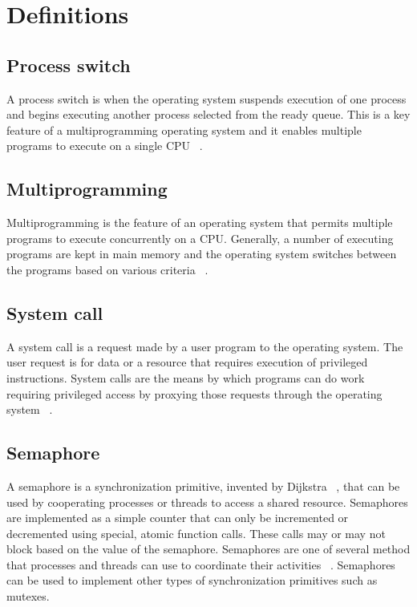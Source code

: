 \documentclass[12pt]{article}
\date{\today}
\begin{document}
\maketitle

\section*{Definitions}
\subsection*{Process switch}
A process switch is when the operating system suspends execution of
one process and begins executing another process selected from the
ready queue.  This is a key feature of a multiprogramming operating
system and it enables multiple programs to execute on a single CPU
~\cite{stallings}.

\subsection*{Multiprogramming}
Multiprogramming is the feature of an operating system that permits
multiple programs to execute concurrently on a CPU. Generally, a
number of executing programs are kept in main memory and the
operating system switches between the programs based on various
criteria ~\cite{stallings}.

\subsection*{System call}
A system call is a request made by a user program to the operating
system.  The user request is for data or a resource that requires
execution of privileged instructions.  System calls are the means by
which programs can do work requiring privileged access by proxying
those requests through the operating system ~\cite{stallings}.

\subsection*{Semaphore}
A semaphore is a synchronization primitive, invented by Dijkstra
~\cite{wikipedia-semaphore}, that can be used by cooperating processes
or threads to access a shared resource.  Semaphores are implemented as
a simple counter that can only be incremented or decremented using
special, atomic function calls.  These calls may or may not block
based on the value of the semaphore.  Semaphores are one of several
method that processes and threads can use to coordinate their
activities ~\cite{stallings}.  Semaphores can be used to implement
other types of synchronization primitives such as mutexes.
\end{document}
